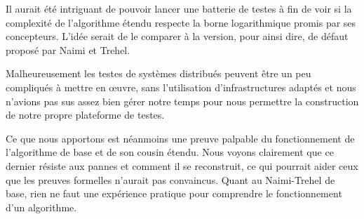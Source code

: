 Il aurait été intriguant de pouvoir lancer une batterie de testes à fin de voir si la complexité de l'algorithme étendu respecte la borne logarithmique promis par ses concepteurs. L'idée serait de le comparer à la version, pour ainsi dire, \og de défaut \fg{} proposé par Naimi et Trehel. 

Malheureusement les testes de systèmes distribués peuvent être un peu compliqués à mettre en œuvre, sans l'utilisation d'infrastructures adaptés et nous n'avions pas sus assez bien gérer notre temps pour nous permettre la construction de notre propre plateforme de testes.

Ce que nous apportons est néanmoins une preuve palpable du fonctionnement de l'algorithme de base et de son cousin étendu. Nous voyons clairement que ce dernier résiste aux pannes et comment il se reconstruit, ce qui pourrait aider ceux que les preuves formelles n'aurait pas convaincus. Quant au Naimi-Trehel de base, rien ne faut une expérience pratique pour comprendre le fonctionnement d'un algorithme. 